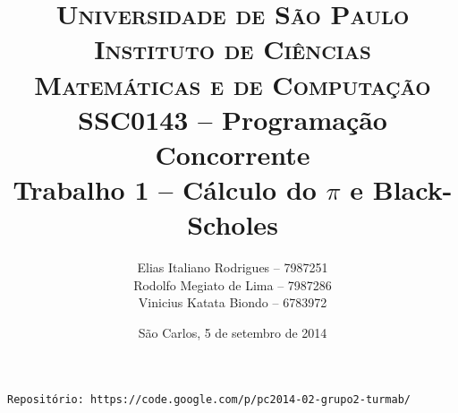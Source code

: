\begin{titlepage}

		\title{
\textsc {\large Universidade de São Paulo\\
Instituto de Ciências Matemáticas e de Computação}\\[1cm]
{\large SSC0143 -- Programação Concorrente}\\[5cm]
{\LARGE Trabalho 1 -- Cálculo do $\pi$} e Black-Scholes\\[4cm]
		}

		\author{
Elias Italiano Rodrigues -- 7987251\\
Rodolfo Megiato de Lima -- 7987286\\
Vinicius Katata Biondo -- 6783972
		}

		\date{
\vfill São Carlos, 5 de setembro de 2014
		}


		\maketitle
\texttt{Repositório: https://code.google.com/p/pc2014-02-grupo2-turmab/}
		\thispagestyle{empty}

\end{titlepage}
